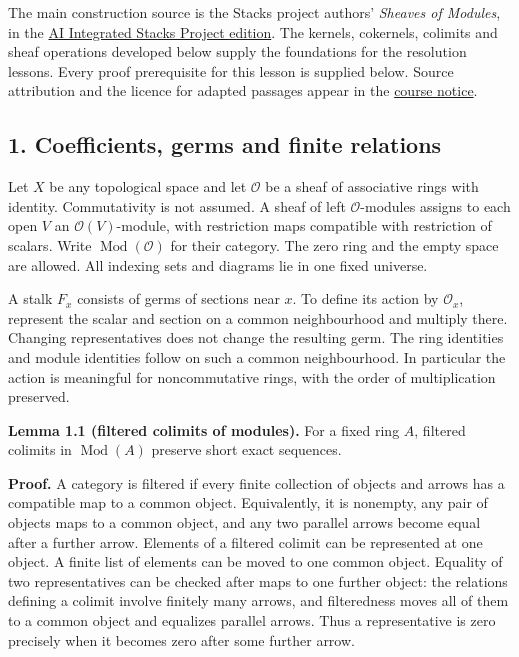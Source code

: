 \documentclass[
  english,
  11pt,
  a4paper,
]{article}
\begin{document}
The main construction source is the Stacks project authors'
\emph{Sheaves of Modules}, in the
\href{https://github.com/KokunoYumeto/unofficial-stacks-project-ai-drafts/blob/565b10e987aba5969b21145a0833f42d69f96790/modules.tex}{AI
Integrated Stacks Project edition}. The kernels, cokernels, colimits and
sheaf operations developed below supply the foundations for the
resolution lessons. Every proof prerequisite for this lesson is supplied
below. Source attribution and the licence for adapted passages appear in
the \hyperref[sources-and-authorship]{course notice}.

\subsection{1. Coefficients, germs and finite
relations}\label{sheaves-of-modules-on-a-ringed-space--1-coefficients-germs-and-finite-relations}

Let \(X\) be any topological space and let \(\mathcal O\) be a sheaf of
associative rings with identity. Commutativity is not assumed. A sheaf
of left \(\mathcal O\)-modules assigns to each open \(V\) an
\(\mathcal O(V)\)-module, with restriction maps compatible with
restriction of scalars. Write \(\operatorname{Mod}(\mathcal O)\) for
their category. The zero ring and the empty space are allowed. All
indexing sets and diagrams lie in one fixed universe.

A stalk \(F_x\) consists of germs of sections near \(x\). To define its
action by \(\mathcal O_x\), represent the scalar and section on a common
neighbourhood and multiply there. Changing representatives does not
change the resulting germ. The ring identities and module identities
follow on such a common neighbourhood. In particular the action is
meaningful for noncommutative rings, with the order of multiplication
preserved.

\textbf{Lemma 1.1 (filtered colimits of modules).} For a fixed ring
\(A\), filtered colimits in \(\operatorname{Mod}(A)\) preserve short
exact sequences.

\textbf{Proof.} A category is filtered if every finite collection of
objects and arrows has a compatible map to a common object.
Equivalently, it is nonempty, any pair of objects maps to a common
object, and any two parallel arrows become equal after a further arrow.
Elements of a filtered colimit can be represented at one object. A
finite list of elements can be moved to one common object. Equality of
two representatives can be checked after maps to one further object: the
relations defining a colimit involve finitely many arrows, and
filteredness moves all of them to a common object and equalizes parallel
arrows. Thus a representative is zero precisely when it becomes zero
after some further arrow.
\end{document}
